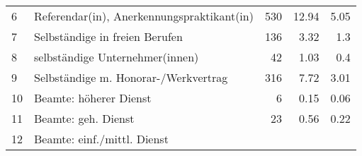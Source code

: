 \begin{longtable}{lXrrr}
     6 &
     \multicolumn{1}{X}{ Referendar(in), Anerkennungspraktikant(in)   } &


       \num{530} &
       \num[round-mode=places,round-precision=2]{12.94} &
         \num[round-mode=places,round-precision=2]{5.05} \\

     7 &
     \multicolumn{1}{X}{ Selbständige in freien Berufen   } &


       \num{136} &
       \num[round-mode=places,round-precision=2]{3.32} &
         \num[round-mode=places,round-precision=2]{1.3} \\

     8 &
     \multicolumn{1}{X}{ selbständige Unternehmer(innen)   } &


       \num{42} &
       \num[round-mode=places,round-precision=2]{1.03} &
         \num[round-mode=places,round-precision=2]{0.4} \\

     9 &
     \multicolumn{1}{X}{ Selbständige m. Honorar-/Werkvertrag   } &


       \num{316} &
       \num[round-mode=places,round-precision=2]{7.72} &
         \num[round-mode=places,round-precision=2]{3.01} \\

     10 &
     \multicolumn{1}{X}{ Beamte: höherer Dienst   } &


       \num{6} &
       \num[round-mode=places,round-precision=2]{0.15} &
         \num[round-mode=places,round-precision=2]{0.06} \\

     11 &
     \multicolumn{1}{X}{ Beamte: geh. Dienst   } &


       \num{23} &
       \num[round-mode=places,round-precision=2]{0.56} &
         \num[round-mode=places,round-precision=2]{0.22} \\

     12 &
     \multicolumn{1}{X}{ Beamte: einf./mittl. Dienst   } &



\end{longtable}
